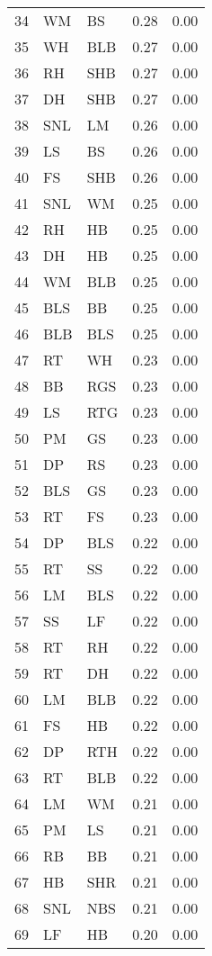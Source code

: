 \begin{table}[ht]
\begin{tabular}{rllrr}
  34 & WM & BS & 0.28 & 0.00 \\ 
  35 & WH & BLB & 0.27 & 0.00 \\ 
  36 & RH & SHB & 0.27 & 0.00 \\ 
  37 & DH & SHB & 0.27 & 0.00 \\ 
  38 & SNL & LM & 0.26 & 0.00 \\ 
  39 & LS & BS & 0.26 & 0.00 \\ 
  40 & FS & SHB & 0.26 & 0.00 \\ 
  41 & SNL & WM & 0.25 & 0.00 \\ 
  42 & RH & HB & 0.25 & 0.00 \\ 
  43 & DH & HB & 0.25 & 0.00 \\ 
  44 & WM & BLB & 0.25 & 0.00 \\ 
  45 & BLS & BB & 0.25 & 0.00 \\ 
  46 & BLB & BLS & 0.25 & 0.00 \\ 
  47 & RT & WH & 0.23 & 0.00 \\ 
  48 & BB & RGS & 0.23 & 0.00 \\ 
  49 & LS & RTG & 0.23 & 0.00 \\ 
  50 & PM & GS & 0.23 & 0.00 \\ 
  51 & DP & RS & 0.23 & 0.00 \\ 
  52 & BLS & GS & 0.23 & 0.00 \\ 
  53 & RT & FS & 0.23 & 0.00 \\ 
  54 & DP & BLS & 0.22 & 0.00 \\ 
  55 & RT & SS & 0.22 & 0.00 \\ 
  56 & LM & BLS & 0.22 & 0.00 \\ 
  57 & SS & LF & 0.22 & 0.00 \\ 
  58 & RT & RH & 0.22 & 0.00 \\ 
  59 & RT & DH & 0.22 & 0.00 \\ 
  60 & LM & BLB & 0.22 & 0.00 \\ 
  61 & FS & HB & 0.22 & 0.00 \\ 
  62 & DP & RTH & 0.22 & 0.00 \\ 
  63 & RT & BLB & 0.22 & 0.00 \\ 
  64 & LM & WM & 0.21 & 0.00 \\ 
  65 & PM & LS & 0.21 & 0.00 \\ 
  66 & RB & BB & 0.21 & 0.00 \\ 
  67 & HB & SHR & 0.21 & 0.00 \\ 
  68 & SNL & NBS & 0.21 & 0.00 \\ 
  69 & LF & HB & 0.20 & 0.00 \\ 

\end{tabular}
\end{table}
